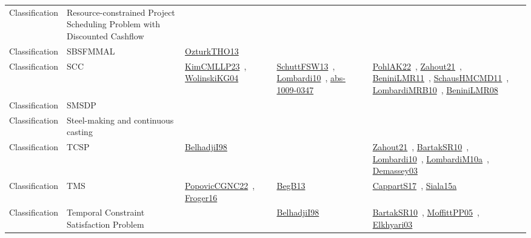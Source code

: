 {\begin{longtable}{lp{3cm}>{\raggedright\arraybackslash}p{6cm}>{\raggedright\arraybackslash}p{6cm}>{\raggedright\arraybackslash}p{8cm}}
Classification & Resource-constrained Project Scheduling Problem with Discounted Cashflow &  &  & \\
Classification & SBSFMMAL & \href{works/OzturkTHO13.pdf}{OzturkTHO13}~\cite{OzturkTHO13} &  & \\
Classification & SCC & \href{works/KimCMLLP23.pdf}{KimCMLLP23}~\cite{KimCMLLP23}, \href{works/WolinskiKG04.pdf}{WolinskiKG04}~\cite{WolinskiKG04} & \href{works/SchuttFSW13.pdf}{SchuttFSW13}~\cite{SchuttFSW13}, \href{works/Lombardi10.pdf}{Lombardi10}~\cite{Lombardi10}, \href{works/abs-1009-0347.pdf}{abs-1009-0347}~\cite{abs-1009-0347} & \href{works/PohlAK22.pdf}{PohlAK22}~\cite{PohlAK22}, \href{works/Zahout21.pdf}{Zahout21}~\cite{Zahout21}, \href{works/BeniniLMR11.pdf}{BeniniLMR11}~\cite{BeniniLMR11}, \href{works/SchausHMCMD11.pdf}{SchausHMCMD11}~\cite{SchausHMCMD11}, \href{works/LombardiMRB10.pdf}{LombardiMRB10}~\cite{LombardiMRB10}, \href{works/BeniniLMR08.pdf}{BeniniLMR08}~\cite{BeniniLMR08}\\
Classification & SMSDP &  &  & \\
Classification & Steel-making and continuous casting &  &  & \\
Classification & TCSP & \href{works/BelhadjiI98.pdf}{BelhadjiI98}~\cite{BelhadjiI98} &  & \href{works/Zahout21.pdf}{Zahout21}~\cite{Zahout21}, \href{works/BartakSR10.pdf}{BartakSR10}~\cite{BartakSR10}, \href{works/Lombardi10.pdf}{Lombardi10}~\cite{Lombardi10}, \href{works/LombardiM10a.pdf}{LombardiM10a}~\cite{LombardiM10a}, \href{works/Demassey03.pdf}{Demassey03}~\cite{Demassey03}\\
Classification & TMS & \href{works/PopovicCGNC22.pdf}{PopovicCGNC22}~\cite{PopovicCGNC22}, \href{works/Froger16.pdf}{Froger16}~\cite{Froger16} & \href{works/BegB13.pdf}{BegB13}~\cite{BegB13} & \href{works/CappartS17.pdf}{CappartS17}~\cite{CappartS17}, \href{works/Siala15a.pdf}{Siala15a}~\cite{Siala15a}\\
Classification & Temporal Constraint Satisfaction Problem &  & \href{works/BelhadjiI98.pdf}{BelhadjiI98}~\cite{BelhadjiI98} & \href{works/BartakSR10.pdf}{BartakSR10}~\cite{BartakSR10}, \href{works/MoffittPP05.pdf}{MoffittPP05}~\cite{MoffittPP05}, \href{works/Elkhyari03.pdf}{Elkhyari03}~\cite{Elkhyari03}\\

\end{longtable}}
